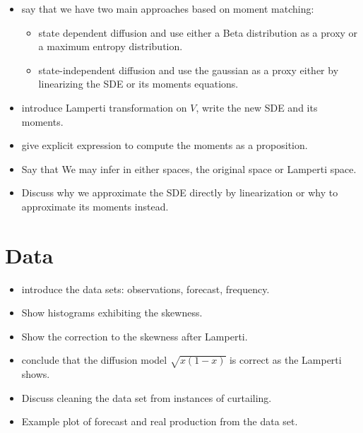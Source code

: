 \documentclass[10pt,twocolumn,letterpaper]{article}
\begin{document}
\begin{itemize}
    \item say that we have two main approaches based on moment matching:
    \begin{itemize}
        \item state dependent diffusion and use either a  Beta distribution as a proxy or a maximum entropy distribution.
        \item state-independent diffusion and use the gaussian as a proxy either by linearizing the SDE or its moments equations.
    \end{itemize}
    \item introduce Lamperti transformation on $V$, write the new SDE and its moments.
    \item give explicit expression to compute the moments as a proposition.
    \item Say that We may infer in either spaces, the original space or Lamperti space.
    \item Discuss why we approximate the SDE directly by linearization or why to approximate its moments instead.

\end{itemize}



\section{Data}

\begin{itemize}
    \item introduce the data sets: observations, forecast, frequency.
    \item Show histograms exhibiting the skewness.
    \item Show the correction to the skewness after Lamperti.
    \item conclude that the diffusion model $\sqrt{x(1-x)}$ is correct as the Lamperti shows.
    \item Discuss cleaning the data set from instances of curtailing.
    \item Example plot of forecast and real production from the data set.
\end{itemize}
\end{document}
